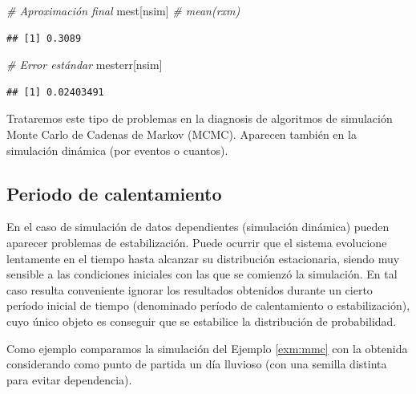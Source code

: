 \documentclass[
]{book}
\newenvironment{Shaded}{\begin{snugshade}}{\end{snugshade}}
\newcommand{\CommentTok}[1]{\textcolor[rgb]{0.56,0.35,0.01}{\textit{#1}}}
\newcommand{\NormalTok}[1]{#1}
\theoremstyle{break}
\theoremstyle{definition}
\theoremstyle{definition}
\theoremstyle{definition}
\theoremstyle{definition}
\theoremstyle{remark}
\begin{document}
\begin{Shaded}
\begin{Highlighting}[]
\CommentTok{\# Aproximación final}
\NormalTok{mest[nsim] }\CommentTok{\# mean(rxm)}
\end{Highlighting}
\end{Shaded}

\begin{verbatim}
## [1] 0.3089
\end{verbatim}

\begin{Shaded}
\begin{Highlighting}[]
\CommentTok{\# Error estándar}
\NormalTok{mesterr[nsim]}
\end{Highlighting}
\end{Shaded}

\begin{verbatim}
## [1] 0.02403491
\end{verbatim}

Trataremos este tipo de problemas en la diagnosis de algoritmos de
simulación Monte Carlo de Cadenas de Markov (MCMC).
Aparecen también en la simulación dinámica (por eventos o cuantos).

\hypertarget{periodo-de-calentamiento}{%
\subsection{Periodo de calentamiento}\label{periodo-de-calentamiento}}

En el caso de simulación de datos dependientes (simulación dinámica)
pueden aparecer problemas de estabilización. Puede ocurrir que el sistema
evolucione lentamente en el tiempo hasta alcanzar su distribución estacionaria,
siendo muy sensible a las condiciones iniciales con las que se comienzó la
simulación. En tal caso resulta conveniente ignorar los resultados obtenidos
durante un cierto período inicial de tiempo (denominado período de calentamiento
o estabilización), cuyo único objeto es conseguir que se estabilice la distribución de
probabilidad.

Como ejemplo comparamos la simulación del Ejemplo \ref{exm:mmc} con la obtenida considerando como punto de partida un día lluvioso (con una semilla distinta para evitar dependencia).
\end{document}
